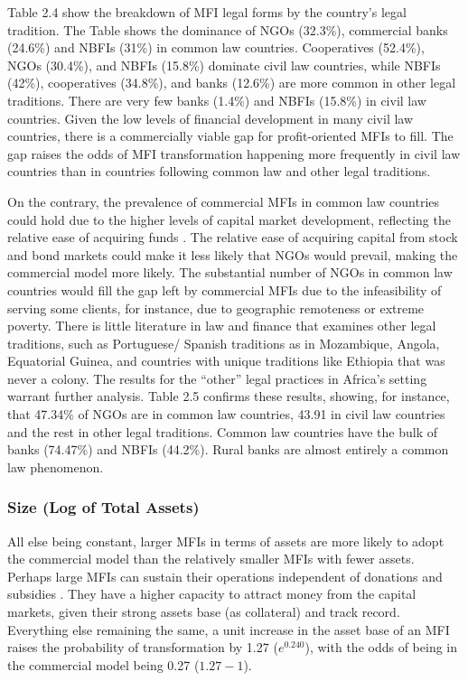 \documentclass[a4paper, nobind]{templates/ociamthesis}
\begin{document}
Table 2.4 show the breakdown of MFI legal forms by the country's legal tradition. The Table shows the dominance of NGOs (32.3\%), commercial banks (24.6\%) and NBFIs (31\%) in common law countries. Cooperatives (52.4\%), NGOs (30.4\%), and NBFIs (15.8\%) dominate civil law countries, while NBFIs (42\%), cooperatives (34.8\%), and banks (12.6\%) are more common in other legal traditions. There are very few banks (1.4\%) and NBFIs (15.8\%) in civil law countries. Given the low levels of financial development in many civil law countries, there is a commercially viable gap for profit-oriented MFIs to fill. The gap raises the odds of MFI transformation happening more frequently in civil law countries than in countries following common law and other legal traditions.

On the contrary, the prevalence of commercial MFIs in common law countries could hold due to the higher levels of capital market development, reflecting the relative ease of acquiring funds \autocite{schnyder2018twenty}. The relative ease of acquiring capital from stock and bond markets could make it less likely that NGOs would prevail, making the commercial model more likely. The substantial number of NGOs in common law countries would fill the gap left by commercial MFIs due to the infeasibility of serving some clients, for instance, due to geographic remoteness or extreme poverty. There is little literature in law and finance that examines other legal traditions, such as Portuguese/ Spanish traditions as in Mozambique, Angola, Equatorial Guinea, and countries with unique traditions like Ethiopia that was never a colony. The results for the ``other'' legal practices in Africa's setting warrant further analysis. Table 2.5 confirms these results, showing, for instance, that 47.34\% of NGOs are in common law countries, 43.91 in civil law countries and the rest in other legal traditions. Common law countries have the bulk of banks (74.47\%) and NBFIs (44.2\%). Rural banks are almost entirely a common law phenomenon.

\hypertarget{size-log-of-total-assets}{%
\subsubsection{Size (Log of Total Assets)}\label{size-log-of-total-assets}}

All else being constant, larger MFIs in terms of assets are more likely to adopt the commercial model than the relatively smaller MFIs with fewer assets. Perhaps large MFIs can sustain their operations independent of donations and subsidies \autocite{d2013unsubsidized}. They have a higher capacity to attract money from the capital markets, given their strong assets base (as collateral) and track record. Everything else remaining the same, a unit increase in the asset base of an MFI raises the probability of transformation by 1.27 (\(e^{0.240}\)), with the odds of being in the commercial model being 0.27 (\(1.27 - 1\)).
\end{document}
